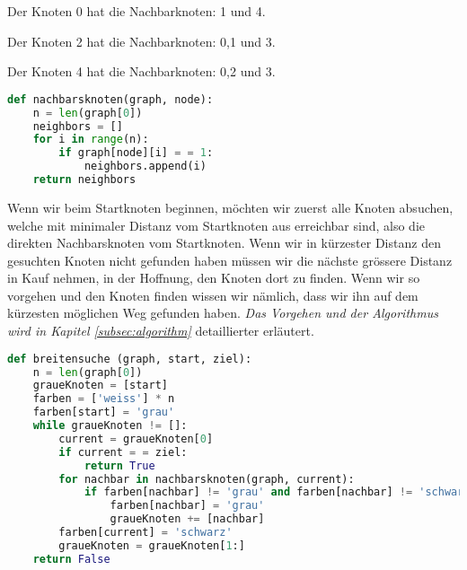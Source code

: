 \begin{lsg}
Der Knoten 0 hat die Nachbarknoten: 1 und 4.

Der Knoten 2 hat die Nachbarknoten: 0,1 und 3.

Der Knoten 4 hat die Nachbarknoten: 0,2 und 3.

\end{lsg}


\begin{lsg}
\hfill
\begin{lstlisting}[language=Python,basicstyle=\small,tabsize=3]
def nachbarsknoten(graph, node):
	n = len(graph[0])
	neighbors = []
	for i in range(n):
		if graph[node][i] = = 1:
			neighbors.append(i)
	return neighbors
\end{lstlisting}
\end{lsg}





\begin{lsg}
Wenn wir beim Startknoten beginnen, m\"ochten wir zuerst alle Knoten absuchen, welche mit minimaler Distanz vom Startknoten aus erreichbar sind, also die direkten Nachbarsknoten vom Startknoten. Wenn wir in k\"urzester Distanz den gesuchten Knoten nicht gefunden haben m\"ussen wir die n\"achste gr\"ossere Distanz in Kauf nehmen, in der Hoffnung, den Knoten dort zu finden. Wenn wir so vorgehen und den Knoten finden wissen wir n\"amlich, dass wir ihn auf dem k\"urzesten m\"oglichen Weg gefunden haben.
\textit{Das Vorgehen und der Algorithmus wird in Kapitel \ref{subsec:algorithm}} detaillierter erl\"autert.
\end{lsg}

\begin{lsg}
\hfill
\begin{lstlisting}[language=Python,basicstyle=\small,tabsize=3]
def breitensuche (graph, start, ziel):
	n = len(graph[0])
	graueKnoten = [start]
	farben = ['weiss'] * n
	farben[start] = 'grau'
	while graueKnoten != []:
		current = graueKnoten[0]
		if current = = ziel:
			return True
		for nachbar in nachbarsknoten(graph, current):
			if farben[nachbar] != 'grau' and farben[nachbar] != 'schwarz':
				farben[nachbar] = 'grau'
				graueKnoten += [nachbar]
		farben[current] = 'schwarz'
		graueKnoten = graueKnoten[1:]
	return False
\end{lstlisting}
\end{lsg}

